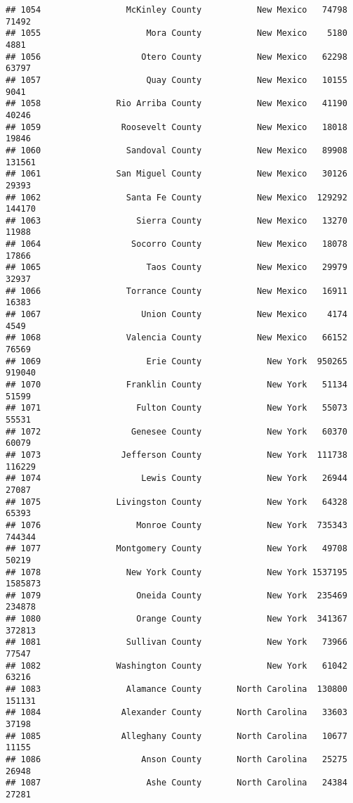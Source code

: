 \documentclass[
]{article}
\begin{document}
\begin{verbatim}
## 1054                 McKinley County           New Mexico   74798   71492
## 1055                     Mora County           New Mexico    5180    4881
## 1056                    Otero County           New Mexico   62298   63797
## 1057                     Quay County           New Mexico   10155    9041
## 1058               Rio Arriba County           New Mexico   41190   40246
## 1059                Roosevelt County           New Mexico   18018   19846
## 1060                 Sandoval County           New Mexico   89908  131561
## 1061               San Miguel County           New Mexico   30126   29393
## 1062                 Santa Fe County           New Mexico  129292  144170
## 1063                   Sierra County           New Mexico   13270   11988
## 1064                  Socorro County           New Mexico   18078   17866
## 1065                     Taos County           New Mexico   29979   32937
## 1066                 Torrance County           New Mexico   16911   16383
## 1067                    Union County           New Mexico    4174    4549
## 1068                 Valencia County           New Mexico   66152   76569
## 1069                     Erie County             New York  950265  919040
## 1070                 Franklin County             New York   51134   51599
## 1071                   Fulton County             New York   55073   55531
## 1072                  Genesee County             New York   60370   60079
## 1073                Jefferson County             New York  111738  116229
## 1074                    Lewis County             New York   26944   27087
## 1075               Livingston County             New York   64328   65393
## 1076                   Monroe County             New York  735343  744344
## 1077               Montgomery County             New York   49708   50219
## 1078                 New York County             New York 1537195 1585873
## 1079                   Oneida County             New York  235469  234878
## 1080                   Orange County             New York  341367  372813
## 1081                 Sullivan County             New York   73966   77547
## 1082               Washington County             New York   61042   63216
## 1083                 Alamance County       North Carolina  130800  151131
## 1084                Alexander County       North Carolina   33603   37198
## 1085                Alleghany County       North Carolina   10677   11155
## 1086                    Anson County       North Carolina   25275   26948
## 1087                     Ashe County       North Carolina   24384   27281

\end{verbatim}
\end{document}
